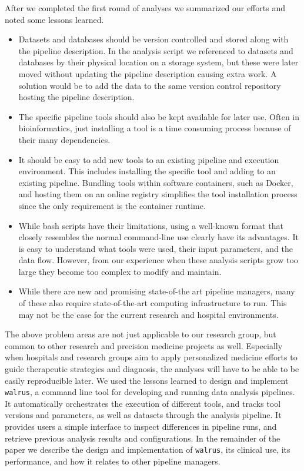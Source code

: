 After we completed the first round of analyses we summarized our efforts and
noted some lessons learned. 
\begin{itemize}
    \item  Datasets and databases should be version controlled and stored
        along with the pipeline description. In the analysis script we
        referenced to datasets and databases by their physical location on a
        storage system, but these were later moved without updating the pipeline
        description causing extra work. A solution would be to add the data to
        the same version control repository hosting the pipeline description.
    \item The specific pipeline tools should also be kept available for
        later use. Often in bioinformatics, just installing a tool is a time
        consuming process because of their many dependencies. 
    \item It should be easy to add new tools to an existing
        pipeline and execution environment. This includes installing the specific
        tool and adding to an existing pipeline. Bundling tools within software
        containers, such as Docker, and hosting them on an online registry
        simplifies the tool installation process since the only requirement is
        the container runtime.
    \item While bash scripts have their
        limitations, using a well-known format that closely resembles the normal
        command-line use clearly have its advantages. It is easy to understand
        what tools were used, their input parameters, and the data flow.
        However, from our experience when these analysis scripts grow too large
        they become too complex to modify and maintain. 
    \item While there are new and promising state-of-the art pipeline
        managers, many of these also require state-of-the-art computing
        infrastructure to run. This may not be the case for the current research
        and hospital environments. 
\end{itemize} 


The above problem areas are not just applicable to our research group, but
common to other research and precision medicine projects as well. Especially
when hospitals and research groups aim to apply personalized medicine efforts to
guide therapeutic strategies and diagnosis, the analyses will have to be able to
be easily reproducible later. We used the lessons learned to  design and
implement \texttt{walrus}, a command line tool for developing and running data
analysis pipelines. It automatically orchestrates the execution of different
tools, and tracks tool versions and parameters, as well as datasets through the
analysis pipeline. It provides users a simple interface to inspect differences
in pipeline runs, and retrieve previous analysis results and configurations. In
the remainder of the paper we describe the design and implementation of
\texttt{walrus}, its clinical use, its performance, and how it relates to other
pipeline managers. 

